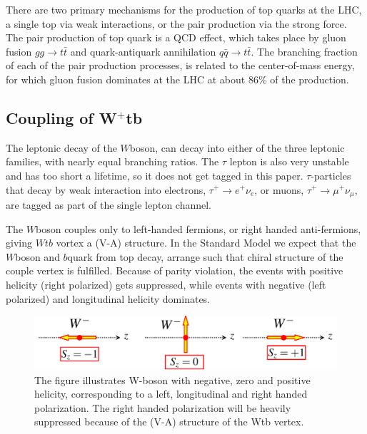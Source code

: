 \documentclass[12pt,a4paper]{article}
\begin{document}
There are two primary mechanisms for the production of top quarks at the LHC, a
single top via weak interactions, or the pair production via the strong force.
The pair production of top quark is a QCD effect, which takes place by gluon
fusion $gg \rightarrow t\bar t$ and quark-antiquark annihilation $q\bar q \rightarrow t\bar t$. The
branching fraction of each of the pair production processes, is related to the
center-of-mass energy, for which gluon fusion dominates at the LHC at about 86\%
of the production.


\subsection{Coupling of W$^+$tb}
The leptonic decay of the $W$boson, can decay into either of the three leptonic
families, with nearly equal branching ratios. The $\tau$ lepton is also very
unstable and has too short a lifetime, so it does not get tagged in this paper.
$\tau$-particles that decay by weak interaction into electrons, $\tau^+ \rightarrow e^+ \nu_e$, or
muons, $\tau^+ \rightarrow \mu^+ \nu_{\mu}$, are tagged as part of the single lepton channel.

The $W$boson couples only to left-handed fermions, or right handed
anti-fermions, giving $Wtb$ vortex a (V-A) structure. In the Standard Model we
expect that the $W$boson and $b$quark from top decay, arrange such that chiral
structure of the couple vertex is fulfilled. Because of parity violation, the
events with positive helicity (right polarized) gets suppressed, while events
with negative (left polarized) and longitudinal helicity dominates.

\begin{figure}[H]
	\includegraphics[width=\linewidth]{W_Polarization.png}
	\caption{The figure illustrates W-boson with negative, zero and positive
    helicity, corresponding to a left, longitudinal and right handed
    polarization. The right handed polarization will be heavily suppressed
    because of the (V-A) structure of the Wtb vertex.}\label{figpolarization}
\end{figure}
\end{document}
